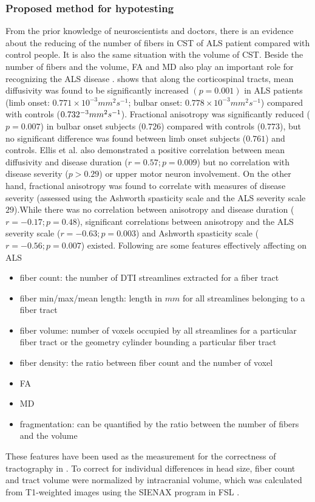 \subsubsection{Proposed method for hypotesting}
\label{subsec:experiments_quatification_proposedmethod}
From the prior knowledge of neuroscientists and doctors, there is an evidence about the reducing of the number of fibers in CST of ALS patient compared with control people. It is also the same situation with the volume of CST. Beside the number of fibers and the volume, FA and MD also play an important role for recognizing the ALS disease \cite{horsfield2002applications}. \cite{ellis1999diffusion} shows that along the corticospinal tracts, mean diffusivity was found to be significantly increased
$(p = 0.001)$ in ALS patients (limb onset: $0.771\times10^{-3} mm^2 s^{-1}$; bulbar onset: $0.778\times10^{-3} mm^2 s^{-1}$) compared with controls ($0.732\time10^{-3} mm^2 s^{-1}$). Fractional anisotropy was significantly reduced ($p = 0.007$) in bulbar onset subjects ($0.726$) compared with controls ($0.773$), but no significant difference was found between limb onset subjects ($0.761$) and controls.
Ellis et al.\cite{ellis1999diffusion} also demonstrated a positive correlation between mean diffusivity and disease duration ($r = 0.57; p = 0.009$) but no correlation with disease severity ($p > 0.29$) or upper motor neuron involvement. On the other hand, fractional anisotropy was found to correlate with measures of disease severity (assessed using the Ashworth spasticity scale and the ALS severity scale $29$).While there was no correlation between anisotropy and disease duration ($r = -0.17; p = 0.48$), significant correlations between anisotropy and the ALS severity scale ($r = -0.63; p = 0.003$) and Ashworth spasticity scale
($r = -0.56; p = 0.007$) existed.
Following are some features effectively affecting on ALS

\begin{itemize}
	\item fiber count: the number of DTI streamlines extracted for a fiber tract
	\item fiber min/max/mean length: length in $mm$ for all streamlines belonging to a fiber tract
	\item fiber volume: number of voxels occupied by all streamlines for a particular fiber tract or the geometry cylinder bounding a particular fiber tract
	\item fiber density: the ratio between fiber count and the number of voxel
	\item FA
	\item MD
	\item fragmentation: can be quantified by the ratio between the number of fibers and the volume
\end{itemize}
These features have been used as the measurement for the correctness of tractography in \cite{wang2012comprehensive}. To correct for individual differences in head size, fiber count and tract volume were normalized by intracranial volume, which was calculated from T1-weighted images using the SIENAX program in FSL \cite{smith2004techniques, smith2002accurate, smith2002automated}. 


